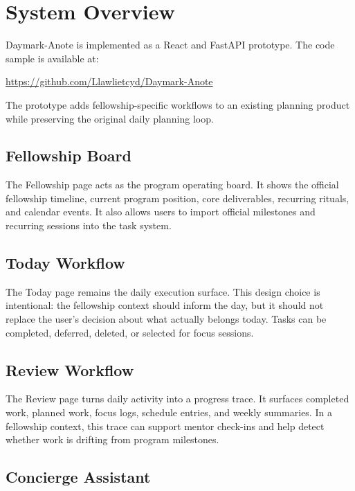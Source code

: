 \documentclass[11pt]{article}
\begin{document}
\section{System Overview}

Daymark-Anote is implemented as a React and FastAPI prototype. The code sample is available at:

\begin{center}
\url{https://github.com/Llawlietcyd/Daymark-Anote}
\end{center}

The prototype adds fellowship-specific workflows to an existing planning product while preserving the original daily planning loop.

\subsection{Fellowship Board}

The Fellowship page acts as the program operating board. It shows the official fellowship timeline, current program position, core deliverables, recurring rituals, and calendar events. It also allows users to import official milestones and recurring sessions into the task system.

\subsection{Today Workflow}

The Today page remains the daily execution surface. This design choice is intentional: the fellowship context should inform the day, but it should not replace the user's decision about what actually belongs today. Tasks can be completed, deferred, deleted, or selected for focus sessions.

\subsection{Review Workflow}

The Review page turns daily activity into a progress trace. It surfaces completed work, planned work, focus logs, schedule entries, and weekly summaries. In a fellowship context, this trace can support mentor check-ins and help detect whether work is drifting from program milestones.

\subsection{Concierge Assistant}
\end{document}
